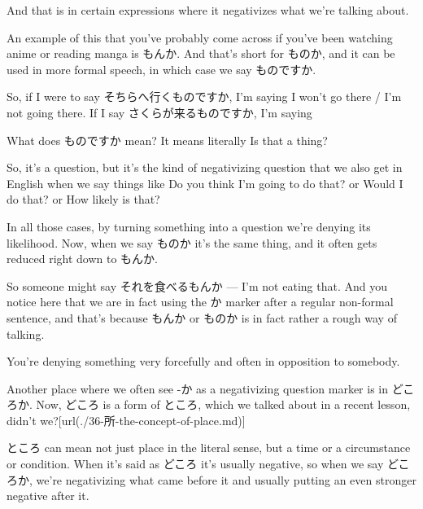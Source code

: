 \stopsectionlevel

\startsectionlevel[title={もんか/ものか},reference={もんかものか}]

And that is in certain expressions where it negativizes what we're talking about.

{}

An example of this that you've probably come across if you've been watching anime or reading manga is もんか. And that's short for ものか, and it can be used in more formal speech, in which case we say ものですか.

So, if I were to say そちらへ行くものですか, I'm saying I won't go there / I'm not going there. If I say さくらが来るものですか, I'm saying 

What does ものですか mean? It means literally Is that a thing?

So, it's a question, but it's the kind of negativizing question that we also get in English when we say things like Do you think I'm going to do that? or Would I do that? or How likely is that?

In all those cases, by turning something into a question we're denying its likelihood. Now, when we say ものか it's the same thing, and it often gets reduced right down to もんか.

So someone might say それを食べるもんか --- I'm not eating that. And you notice here that we are in fact using the か marker after a regular non-formal sentence, and that's because もんか or ものか is in fact rather a rough way of talking.

You're denying something very forcefully and often in opposition to somebody.

\stopsectionlevel

\startsectionlevel[title={どころか},reference={どころか}]

Another place where we often see -か as a negativizing question marker is in どころか. Now, どころ is a form of ところ, which we talked about in a recent lesson, didn't we?\goto{{[}36{]}}[url(./36-所-the-concept-of-place.md)]

{}

ところ can mean not just place in the literal sense, but a time or a circumstance or condition. When it's said as どころ it's usually negative, so when we say どころか, we're negativizing what came before it and usually putting an even stronger negative after it.

